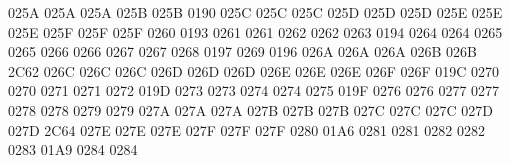 \setcclcucx 025A 025A 025A %
\setcclcucx 025B 025B 0190 %
\setcclcucx 025C 025C 025C %
\setcclcucx 025D 025D 025D %
\setcclcucx 025E 025E 025E %
\setcclcucx 025F 025F 025F %
 0260 0193 %
 0261 0261 %
 0262 0262 %
 0263 0194 %
 0264 0264 %
 0265 0265 %
 0266 0266 %
 0267 0267 %
 0268 0197 %
 0269 0196 %
\setcclcucx 026A 026A 026A %
\setcclcucx 026B 026B 2C62 %
\setcclcucx 026C 026C 026C %
\setcclcucx 026D 026D 026D %
\setcclcucx 026E 026E 026E %
\setcclcucx 026F 026F 019C %
 0270 0270 %
 0271 0271 %
 0272 019D %
 0273 0273 %
 0274 0274 %
 0275 019F %
 0276 0276 %
 0277 0277 %
 0278 0278 %
 0279 0279 %
\setcclcucx 027A 027A 027A %
\setcclcucx 027B 027B 027B %
\setcclcucx 027C 027C 027C %
\setcclcucx 027D 027D 2C64 %
\setcclcucx 027E 027E 027E %
\setcclcucx 027F 027F 027F %
 0280 01A6 %
 0281 0281 %
 0282 0282 %
 0283 01A9 %
 0284 0284 %
